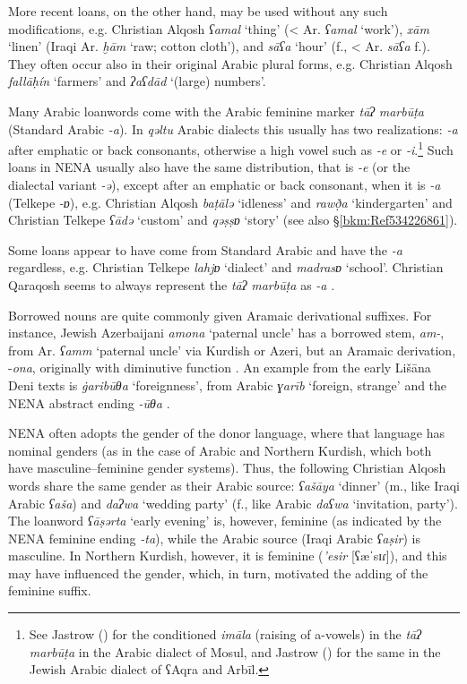 \documentclass[output=paper]{langsci/langscibook}
\begin{document}
More recent loans, on the other hand, may be used without any such modifications, e.g. Christian Alqosh \textit{ʕamal} ‘thing’ (< Ar. \textit{ʕamal} ‘work’), \textit{xām} ‘linen’ (Iraqi Ar. \textit{ḫām} ‘raw; cotton cloth’), and \textit{sāʕa} ‘hour’ (f., < Ar. \textit{sāʕa} f.). They often occur also in their original Arabic plural forms, e.g. Christian Alqosh \textit{fallāḥín} ‘farmers’ and \textit{ʔaʕdād} ‘(large) numbers’. 

Many Arabic loanwords come with the Arabic feminine marker \textit{tāʔ} \textit{marbūṭa} (Standard Arabic \textit{\nobreakdash-a}). In \textit{qəltu} Arabic dialects this usually has two realizations: \textit{\nobreakdash-a} after emphatic or back consonants, otherwise a high vowel such as \textit{\nobreakdash-e} or \textit{\nobreakdash-i}.\footnote{See Jastrow (\citeyear[40]{Jastrow1979}) for the conditioned \textit{imāla} (raising of a-vowels) in the \textit{tāʔ} \textit{marbūṭa} in the Arabic dialect of Mosul, and Jastrow (\citeyear[70]{Jastrow1990book}) for the same in the Jewish Arabic dialect of ʕAqra and Arbīl.} Such loans in NENA usually also have the same distribution, that is \textit{{}-e} (or the dialectal variant \textit{-ə}), except after an emphatic or back consonant, when it is \textit{\nobreakdash-a} (Telkepe \textit{\nobreakdash-ɒ}), e.g. Christian Alqosh \textit{baṭālə} ‘idleness’ and \textit{rawð̣a} ‘kindergarten’ and Christian Telkepe \textit{ʕādə} ‘custom’ and \textit{qəṣṣɒ} ‘story’ (see also §\ref{bkm:Ref534226861}).

Some loans appear to have come from Standard Arabic and have the \textit{\nobreakdash-a} regardless, e.g. Christian Telkepe \textit{lahjɒ} ‘dialect’ and \textit{madrasɒ} ‘school’. Christian Qaraqosh seems to always represent the \textit{tāʔ} \textit{marbūṭa} as \textit{{}-a} \citep[204]{Khan2002}.

Borrowed nouns are quite commonly given Aramaic derivational suffixes. For instance, Jewish Azerbaijani \textit{amona} ‘paternal uncle’ has a borrowed stem, \textit{am-}, from Ar. \textit{ʕamm} ‘paternal uncle’ via Kurdish or Azeri, but an Aramaic derivation, \nobreakdash-\textit{ona}, originally with diminutive function \citep[165]{Garbell1965}. An example from the early Lišāna Deni texts is \textit{\.garibūθa} ‘foreignness’, from Arabic \textit{ɣarīb} ‘foreign, strange’ and the NENA abstract ending \textit{{}-ūθa} \citep[205]{Sabar1984}.

NENA often adopts the gender of the donor language, where that language has nominal genders (as in the case of Arabic and Northern Kurdish, which both have masculine--feminine gender systems). Thus, the following Christian Alqosh words share the same gender as their Arabic source: \textit{ʕašāya} ‘dinner’ (m., like Iraqi Arabic \textit{ʕaša}) and \textit{daʔwa} ‘wedding party’ (f., like Arabic \textit{daʕwa} ‘invitation, party’). The loanword \textit{ʕāṣərta} ‘early evening’ is, however, feminine (as indicated by the NENA feminine ending \textit{{}-ta}), while the Arabic source (Iraqi Arabic \textit{ʕaṣir}) is masculine. In Northern Kurdish, however, it is feminine (\textit{{}'esir} [ʕæˈsɪɾ]), and this may have influenced the gender, which, in turn, motivated the adding of the feminine suffix.
\end{document}

